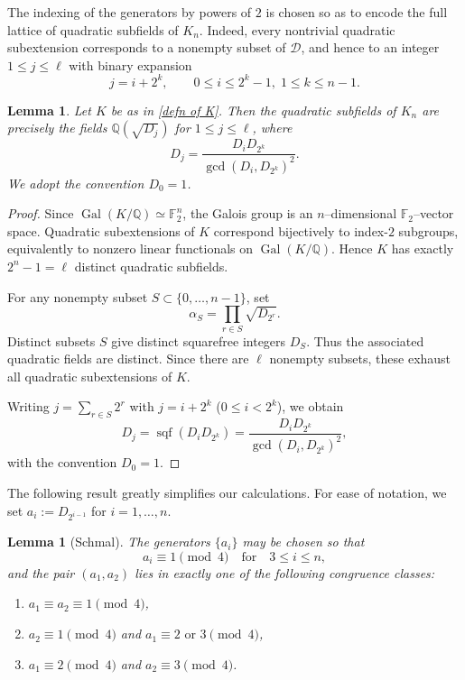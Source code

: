 \documentclass{amsart}
\newcommand{\Q}{\mathbb{Q}}
\newcommand{\F}{\mathbb{F}}
\newcommand{\op}[1]{\operatorname{#1}}
\theoremstyle{plain}
\newtheorem{lemma}[theorem]{Lemma}
\theoremstyle{definition}
\theoremstyle{remark}
\numberwithin{equation}{section}
\begin{document}
The indexing of the generators by powers of $2$ is chosen so as to encode the full lattice of quadratic subfields of $K_n$.  
Indeed, every nontrivial quadratic subextension corresponds to a nonempty subset of $\mathcal D$, and hence to an integer $1\le j\le \ell$ with binary expansion
\[
j=i+2^k,\qquad 0\le i\le 2^k-1,\; 1\le k\le n-1 .
\]

\begin{lemma}
Let $K$ be as in \eqref{defn of K}. Then the quadratic subfields of $K_n$ are precisely the fields $\Q(\sqrt{D_j})$ for $1\le j\le \ell$, where
\begin{equation}\label{eq:quadratic-subfields}
D_j=\frac{D_iD_{2^k}}{\gcd(D_i,D_{2^k})^2}.
\end{equation}
We adopt the convention $D_0=1$.
\end{lemma}
\begin{proof}
 
Since $\op{Gal}(K/\Q)\simeq \F_2^n$, the Galois group is an
$n$–dimensional $\mathbb F_2$–vector space.
Quadratic subextensions of $K$ correspond bijectively to
index-$2$ subgroups, equivalently to nonzero linear functionals
on $\op{Gal}(K/\Q)$.
Hence $K$ has exactly $2^n-1=\ell$ distinct quadratic subfields.

For any nonempty subset $S\subset\{0,\dots,n-1\}$,
set
\[
\alpha_S=\prod_{r\in S}\sqrt{D_{2^r}}.
\]
Distinct subsets $S$ give distinct squarefree integers $D_S$. Thus the associated quadratic fields are distinct. Since there are $\ell$ nonempty subsets, these exhaust all
quadratic subextensions of $K$.
\par Writing $j=\sum_{r\in S}2^r$ with
$j=i+2^k$ ($0\le i<2^k$),
we obtain
\[
D_j=\operatorname{sqf}(D_iD_{2^k})
=\frac{D_iD_{2^k}}{\gcd(D_i,D_{2^k})^2},
\]
with the convention $D_0=1$.
\end{proof}

The following result greatly simplifies our calculations. For ease of notation, we set $a_i:=D_{2^{i-1}}$ for $i=1, \dots, n$.

\begin{lemma}[Schmal]
The generators $\{a_i\}$ may be chosen so that
\[
a_i\equiv 1 \pmod{4} \quad \text{for}\quad 3\le i\le n,
\]
and the pair $(a_1,a_2)$ lies in exactly one of the following congruence classes:
\begin{enumerate}
\item[(i)] $a_1\equiv a_2\equiv 1 \pmod{4}$,
\item[(ii)] $a_2\equiv 1 \pmod{4}$ and $a_1\equiv 2 \text{ or }3 \pmod{4}$,
\item[(iii)] $a_1\equiv 2 \pmod{4}$ and $a_2\equiv 3 \pmod{4}$.
\end{enumerate}
\end{lemma}
\end{document}
